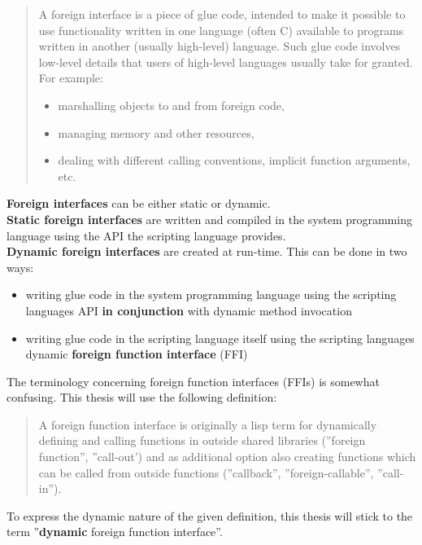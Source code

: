 \begin{quotation}
A foreign interface is a piece of glue code, intended to make it possible to use functionality written in one language (often C) available to programs written in another (usually high-level) language. Such glue code involves low-level details that users of high-level languages usually take for granted. For example:
\begin{itemize}
\item marshalling objects to and from foreign code,
\item managing memory and other resources,
\item dealing with different calling conventions, implicit function arguments, etc.
\end{itemize}
\end{quotation}

\textbf{Foreign interfaces} can be either static or dynamic.\\
\textbf{Static foreign interfaces} are written and compiled in the system programming language using the API the scripting language provides.\\
\textbf{Dynamic foreign interfaces} are created at run-time. This can be done in two ways:
\begin{itemize}
\item writing glue code in the system programming language using the scripting languages API \textbf{in conjunction} with dynamic method invocation
\item writing glue code in the scripting language itself using the scripting languages dynamic \textbf{foreign function interface} (FFI)
\end{itemize}

The terminology concerning foreign function interfaces (FFIs) is somewhat confusing. This thesis will use the following definition:

\begin{quotation}
A foreign function interface is originally a lisp term for dynamically defining and calling functions in outside shared libraries (''foreign function'', ''call-out') and as additional option also creating functions which can be called from outside functions (''callback'', ''foreign-callable'', ''call-in'').
\end{quotation}

To express the dynamic nature of the given definition, this thesis will stick to the term ''\textbf{dynamic} foreign function interface''.

